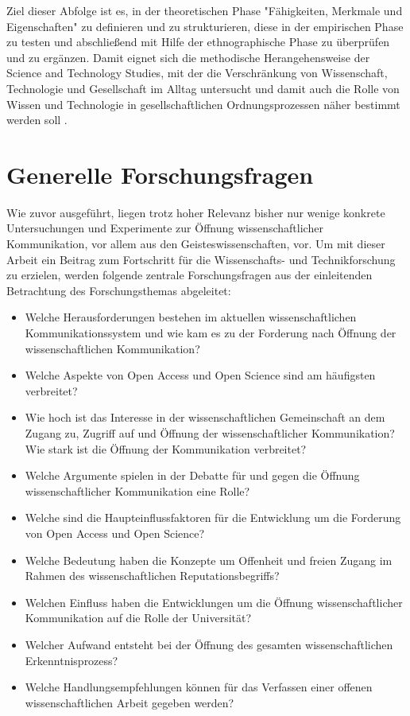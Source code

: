 Ziel dieser Abfolge ist es, in der theoretischen Phase "Fähigkeiten, Merkmale und Eigenschaften" \cite{raab_2012_fragebogen} zu definieren und zu strukturieren, diese in der empirischen Phase zu testen und abschließend mit Hilfe der ethnographische Phase zu überprüfen und zu ergänzen. Damit eignet sich die methodische Herangehensweise der Science and Technology Studies, mit der die Verschränkung von Wissenschaft, Technologie und Gesellschaft im Alltag untersucht und damit auch die Rolle von Wissen und Technologie in gesellschaftlichen Ordnungsprozessen näher bestimmt werden soll \cite{beck_2014_science}.

\section{Generelle Forschungsfragen}

Wie zuvor ausgeführt, liegen trotz hoher Relevanz bisher nur wenige konkrete Untersuchungen und Experimente zur Öffnung wissenschaftlicher Kommunikation, vor allem aus den Geisteswissenschaften, vor. Um mit dieser Arbeit ein Beitrag zum Fortschritt für die Wissenschafts- und Technikforschung zu erzielen, werden folgende zentrale Forschungsfragen aus der einleitenden Betrachtung des Forschungsthemas abgeleitet:
\begin{itemize}
\item Welche Herausforderungen bestehen im aktuellen wissenschaftlichen Kommunikationssystem und wie kam es zu der Forderung nach Öffnung der wissenschaftlichen Kommunikation?
\item Welche Aspekte von Open Access und Open Science sind am häufigsten verbreitet?
\item Wie hoch ist das Interesse in der wissenschaftlichen Gemeinschaft an dem Zugang zu, Zugriff auf und Öffnung der wissenschaftlicher Kommunikation? Wie stark ist die Öffnung der Kommunikation verbreitet?
\item Welche Argumente spielen in der Debatte für und gegen die Öffnung wissenschaftlicher Kommunikation eine Rolle?
\item Welche sind die Haupteinflussfaktoren für die Entwicklung um die Forderung von Open Access und Open Science?
\item Welche Bedeutung haben die Konzepte um Offenheit und freien Zugang im Rahmen des wissenschaftlichen Reputationsbegriffs?
\item Welchen Einfluss haben die Entwicklungen um die Öffnung wissenschaftlicher Kommunikation auf die Rolle der Universität?
\item Welcher Aufwand entsteht bei der Öffnung des gesamten wissenschaftlichen Erkenntnisprozess?
\item Welche Handlungsempfehlungen können für das Verfassen einer offenen wissenschaftlichen Arbeit gegeben werden?
\end{itemize}

